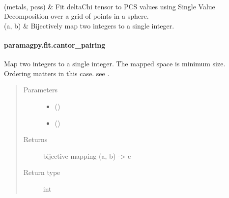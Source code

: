 \documentclass[a4paper,10pt,english,openany,oneside]{sphinxmanual}
\begin{document}
\begin{savenotes}
\begin{longtable}{}
\\
\hline
{\hyperref[\detokenize{reference/generated/paramagpy.fit.svd_gridsearch_fit_metal_from_pcs:paramagpy.fit.svd_gridsearch_fit_metal_from_pcs}]{}}(metals, pcss)
&
Fit deltaChi tensor to PCS values using Single Value Decomposition over a grid of points in a sphere.
\\
\hline
{\hyperref[\detokenize{reference/generated/paramagpy.fit.unique_pairing:paramagpy.fit.unique_pairing}]{}}(a, b)
&
Bijectively map two integers to a single integer.
\\
\hline
\end{longtable}\sphinxatlongtableend\end{savenotes}


\paragraph{paramagpy.fit.cantor\_pairing}
\label{\detokenize{reference/generated/paramagpy.fit.cantor_pairing:paramagpy-fit-cantor-pairing}}\label{\detokenize{reference/generated/paramagpy.fit.cantor_pairing::doc}}

\begin{fulllineitems}
\label{\detokenize{reference/generated/paramagpy.fit.cantor_pairing:paramagpy.fit.cantor_pairing}}
Map two integers to a single integer.
The mapped space is minimum size.
Ordering matters in this case.
see .
\begin{quote}\begin{description}
\item[{Parameters}] \leavevmode\begin{itemize}
\item {} 
 () \textendash{} 

\item {} 
 () \textendash{} 

\end{itemize}

\item[{Returns}] \leavevmode
{} \textendash{} bijective mapping (a, b) -\textgreater{} c

\item[{Return type}] \leavevmode
int

\end{description}\end{quote}

\end{fulllineitems}
\end{document}
